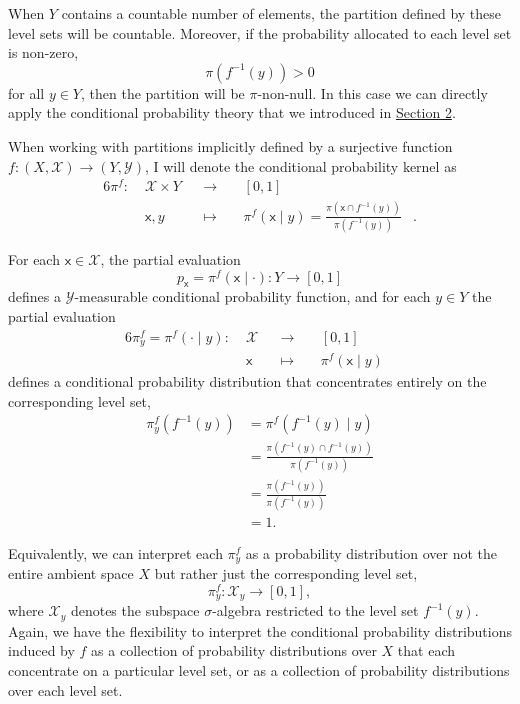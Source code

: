 \documentclass[
  letterpaper,
  DIV=11,
  numbers=noendperiod]{scrartcl}
\begin{document}
When \(Y\) contains a countable number of elements, the partition
defined by these level sets will be countable. Moreover, if the
probability allocated to each level set is non-zero, \[
\pi( f^{-1}(y) ) > 0
\] for all \(y \in Y\), then the partition will be \(\pi\)-non-null. In
this case we can directly apply the conditional probability theory that
we introduced in \hyperref[sec:explicit-conditional]{Section 2}.

When working with partitions implicitly defined by a surjective function
\(f : (X, \mathcal{X}) \rightarrow (Y, \mathcal{Y})\), I will denote the
conditional probability kernel as \begin{alignat*}{6}
\pi^{f} :\; &\mathcal{X} \times Y& &\rightarrow& \; &[0, 1]&
\\
&\mathsf{x}, y& &\mapsto&
&\pi^{f} ( \mathsf{x} \mid y ) =
 \frac{ \pi(\mathsf{x} \cap f^{-1}(y)) }{ \pi(f^{-1}(y)) } &.
\end{alignat*}

For each \(\mathsf{x} \in \mathcal{X}\), the partial evaluation \[
p_{\mathsf{x}} = \pi^{f} ( \mathsf{x} \mid \cdot )
: Y \rightarrow [0, 1]
\] defines a \(\mathcal{Y}\)-measurable conditional probability
function, and for each \(y \in Y\) the partial evaluation
\begin{alignat*}{6}
\pi^{f}_{y} = \pi^{f} ( \cdot \mid y )
:\; &\mathcal{X}& &\rightarrow& \; &[0, 1]&
\\
&\mathsf{x}& &\mapsto& &\pi^{f} ( \mathsf{x} \mid y )  &
\end{alignat*} defines a conditional probability distribution that
concentrates entirely on the corresponding level set, \begin{align*}
\pi^{f}_{y}( f^{-1}(y) )
&=
\pi^{f}( f^{-1}(y) \mid y )
\\
&=
\frac{ \pi(f^{-1}(y) \cap f^{-1}(y)) }{ \pi(f^{-1}(y)) }
\\
&=
\frac{ \pi(f^{-1}(y) ) }{ \pi(f^{-1}(y)) }
\\
&=
1.
\end{align*}

Equivalently, we can interpret each \(\pi^{f}_{y}\) as a probability
distribution over not the entire ambient space \(X\) but rather just the
corresponding level set, \[
\pi^{f}_{y} : \mathcal{X}_{y} \rightarrow [0, 1],
\] where \(\mathcal{X}_{y}\) denotes the subspace \(\sigma\)-algebra
restricted to the level set \(f^{-1}(y)\). Again, we have the
flexibility to interpret the conditional probability distributions
induced by \(f\) as a collection of probability distributions over \(X\)
that each concentrate on a particular level set, or as a collection of
probability distributions over each level set.
\end{document}
